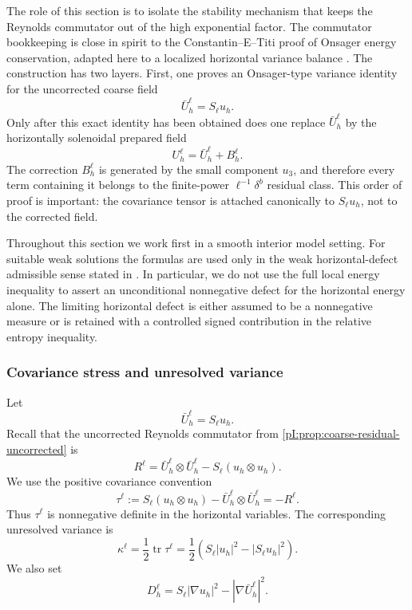 \documentclass[11pt]{article}
\numberwithin{equation}{section}
\theoremstyle{plain}
\theoremstyle{definition}
\theoremstyle{remark}
\begin{document}
The role of this section is to isolate the stability mechanism that keeps the Reynolds commutator out of the high exponential factor.  The commutator bookkeeping is close in spirit to the Constantin--E--Titi proof of Onsager energy conservation, adapted here to a localized horizontal variance balance \cite{ConstantinETiti1994}.  The construction has two layers.  First, one proves an Onsager-type variance identity for the uncorrected coarse field
\[
        \bar U_h^\ell=S_\ell u_h .
\]
Only after this exact identity has been obtained does one replace \(\bar U_h^\ell\) by the horizontally solenoidal prepared field
\[
        U_h^\ell=\bar U_h^\ell+B_h^\ell.
\]
The correction \(B_h^\ell\) is generated by the small component \(u_3\), and therefore every term containing it belongs to the finite-power \(\ell^{-1}\delta^b\) residual class.  This order of proof is important: the covariance tensor is attached canonically to \(S_\ell u_h\), not to the corrected field.

Throughout this section we work first in a smooth interior model setting.  For suitable weak solutions the formulas are used only in the weak horizontal-defect admissible sense stated in .  In particular, we do not use the full local energy inequality to assert an unconditional nonnegative defect for the horizontal energy alone.  The limiting horizontal defect is either assumed to be a nonnegative measure or is retained with a controlled signed contribution in the relative entropy inequality.

\subsubsection{Covariance stress and unresolved variance}

Let
\[
        \bar U_h^\ell=S_\ell u_h.
\]
Recall that the uncorrected Reynolds commutator from \cref{pI:prop:coarse-residual-uncorrected} is
\[
        R^\ell=\bar U_h^\ell\otimes \bar U_h^\ell-S_\ell(u_h\otimes u_h).
\]
We use the positive covariance convention
\begin{equation}\label{pI:eq:tau-positive-definition}
        \tau^\ell
        :=S_\ell(u_h\otimes u_h)-\bar U_h^\ell\otimes\bar U_h^\ell
        =-R^\ell .
\end{equation}
Thus \(\tau^\ell\) is nonnegative definite in the horizontal variables.  The corresponding unresolved variance is
\begin{equation}\label{pI:eq:kappa-positive-definition}
        \kappa^\ell=\frac12\operatorname{tr}\tau^\ell
        =\frac12\left(S_\ell|u_h|^2-|S_\ell u_h|^2\right).
\end{equation}
We also set
\begin{equation}\label{pI:eq:Dh-var-definition}
        D_h^\ell=S_\ell|\nabla u_h|^2-|\nabla \bar U_h^\ell|^2.
\end{equation}
\end{document}
